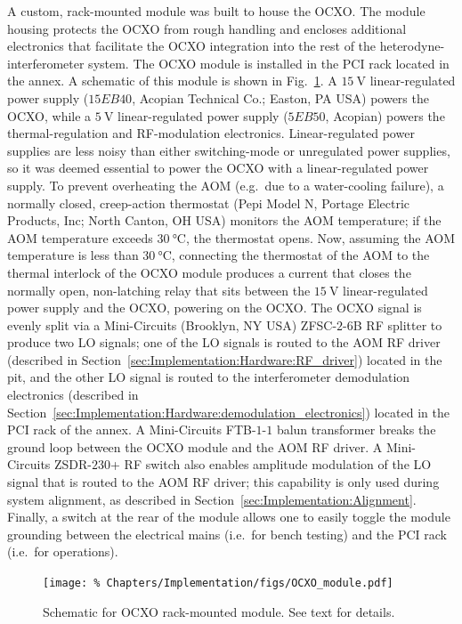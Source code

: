 A custom, rack-mounted module was built to house the OCXO.
The module housing protects the OCXO from rough handling and
encloses additional electronics that facilitate
the OCXO integration into the rest of the heterodyne-interferometer system.
The OCXO module is installed in the PCI rack
located in the \diiid\space annex.
A schematic of this module is shown in
Fig.~\ref{fig:Implementation:OCXO_module}.
A $\SI{15}{\volt}$ linear-regulated power supply
($15EB40$, Acopian Technical Co.; Easton, PA USA)
powers the OCXO, while
a $\SI{5}{\volt}$ linear-regulated power supply ($5EB50$, Acopian)
powers the thermal-regulation and RF-modulation electronics.
Linear-regulated power supplies are less noisy than
either switching-mode or unregulated power supplies, so
it was deemed essential to power the OCXO
with a linear-regulated power supply.
To prevent overheating the AOM
(e.g.\ due to a water-cooling failure),
a normally closed, creep-action thermostat
(Pepi Model N, Portage Electric Products, Inc; North Canton, OH USA)
monitors the AOM temperature;
if the AOM temperature exceeds $\SI{30}{\celsius}$,
the thermostat opens.
Now, assuming the AOM temperature is less than $\SI{30}{\celsius}$,
connecting the thermostat of the AOM
to the thermal interlock of the OCXO module
produces a current that closes the normally open, non-latching relay
that sits between the $\SI{15}{\volt}$ linear-regulated power supply
and the OCXO, powering on the OCXO.
The OCXO signal is evenly split via
a Mini-Circuits (Brooklyn, NY USA) {ZFSC-$2$-$6$B} RF splitter
to produce two LO signals;
one of the LO signals is routed to the AOM RF driver
(described in Section~\ref{sec:Implementation:Hardware:RF_driver})
located in the \diiid\space pit, and
the other LO signal is routed to the interferometer demodulation electronics
(described in
Section~\ref{sec:Implementation:Hardware:demodulation_electronics})
located in the PCI rack of the \diiid\space annex.
A Mini-Circuits {FTB-$1$-$1$} balun transformer
breaks the ground loop between the OCXO module and the AOM RF driver.
A Mini-Circuits {ZSDR-$230$+} RF switch also enables amplitude modulation
of the LO signal that is routed to the AOM RF driver;
this capability is only used during system alignment, as described in
Section~\ref{sec:Implementation:Alignment}.
Finally, a switch at the rear of the module
allows one to easily toggle the module grounding between
the electrical mains (i.e.\ for bench testing) and
the PCI rack (i.e.\ for operations).

\begin{figure}
  \centering
  \texttt{[image: \%
    Chapters/Implementation/figs/OCXO\_module.pdf]}
  \caption[Schematic for OCXO rack-mounted module]{%
    Schematic for OCXO rack-mounted module. See text for details.}
  \label{fig:Implementation:OCXO_module}
\end{figure}


